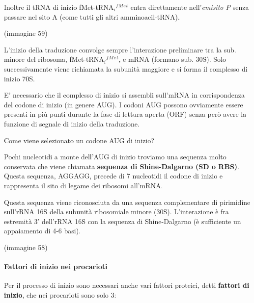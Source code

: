 \documentclass[]{article}
\begin{document}
Inoltre il tRNA di inizio fMet-tRNA\(_i\)\(^f\)\(^M\)\(^e\)\(^t\) entra
direttamente nell'\emph{emisito P} senza passare nel sito A (come tutti
gli altri amminoacil-tRNA).

(immagine 59)

L'inizio della traduzione convolge sempre l'interazione preliminare tra
la sub. minore del ribosoma, fMet-tRNA\(_i\)\(^f\)\(^M\)\(^e\)\(^t\), e
mRNA (formano sub. 30S). Solo successivamente viene richiamata la
subunità maggiore e si forma il complesso di inizio 70S.

E' necessario che il complesso di inizio si assembli sull'mRNA in
corrispondenza del codone di inizio (in genere AUG). I codoni AUG
possono ovviamente essere presenti in più punti durante la fase di
lettura aperta (ORF) senza però avere la funzione di segnale di inizio
della traduzione.

Come viene selezionato un codone AUG di inizio?

Pochi nucleotidi a monte dell'AUG di inizio troviamo una sequenza molto
conservata che viene chiamata \textbf{sequenza di Shine-Dalgarno (SD o
RBS)}. Questa sequenza, AGGAGG, precede di 7 nucleotidi il codone di
inizio e rappresenta il sito di legame dei ribosomi all'mRNA.

Questa sequenza viene riconosciuta da una sequenza complementare di
pirimidine sull'rRNA 16S della subunità ribosomiale minore (30S).
L'interazione è fra estremità 3' dell'rRNA 16S con la sequenza di
Shine-Dalgarno (è sufficiente un appaiamento di 4-6 basi).

(immagine 58)

\paragraph{Fattori di inizio nei
procarioti}\label{fattori-di-inizio-nei-procarioti}

Per il processo di inizio sono necessari anche vari fattori proteici,
detti \textbf{fattori di inizio}, che nei procarioti sono solo 3:
\end{document}

